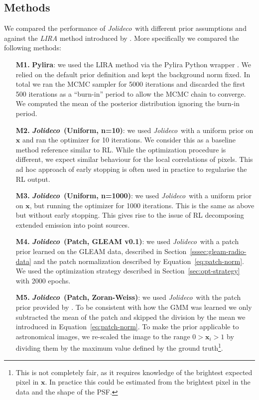 \documentclass[twocolumn, lineno]{aastex631}
\newcommand{\jolideco}{\textit{Jolideco}~}
\begin{document}
    \subsection{Methods}
    \label{subsec:methods}
    We compared the performance of \jolideco with different prior assumptions and against the \textit{LIRA} method introduced by \cite{Esch2004}. More specifically we compared the following methods:

    \begin{enumerate}

        \item[\bf M1.] \textbf{Pylira}: we used the LIRA method \citep{Esch2004} via the Pylira Python wrapper \citep{Donath2022}. We relied on the default prior definition and kept the background norm fixed. In total we ran the MCMC sampler for 5000 iterations and discarded the first 500 iterations as a \enquote{burn-in} period to allow the MCMC chain to converge. We computed the mean of the posterior distribution ignoring the burn-in period.
        
        \item[\bf M2.] \textbf{\jolideco (Uniform, n=10)}: we used \jolideco with a uniform prior on $\mathbf{x}$ and ran the optimizer for 10 iterations. We consider this as a baseline method reference similar to RL. While the optimization procedure is different, we expect similar behaviour for the local correlations of pixels. This ad hoc approach of early stopping is often used in practice to regularise the RL output.
        
        \item[\bf M3.] \textbf{\jolideco (Uniform, n=1000)}:  we used \jolideco with a uniform prior on $\mathbf{x}$, but running the optimizer for 1000 iterations. This is the same as above but without early stopping. This gives rise to the issue of RL decomposing extended emission into point sources.
        
        \item[\bf M4.] \textbf{\jolideco (Patch, GLEAM v0.1)}: we used \jolideco with a patch prior learned on the GLEAM data, described in Section~\ref{sssec:gleam-radio-data} and the patch normalization described by Equation~\ref{eq:patch-norm}. We used the optimization strategy described in Section~\ref{sec:opt-strategy} with 2000 epochs.
        
        \item[\bf M5.] \textbf{\jolideco (Patch, Zoran-Weiss)}: we used \jolideco with the patch prior provided by \cite{Zoran2011}. To be consistent with how the GMM was learned we only subtracted the mean of the patch and skipped the division by the mean we introduced in Equation~\ref{eq:patch-norm}. To make the prior applicable to astronomical images, we re-scaled the image to the range $0 > \mathbf{x}_i > 1$ by dividing them by the maximum value defined by the ground truth\footnote{This is not completely fair, as it requires knowledge of the brightest expected pixel in $\mathbf{x}$. In practice this could be estimated from the brightest pixel in the data and the shape of the PSF.}.
    \end{enumerate}
\end{document}

